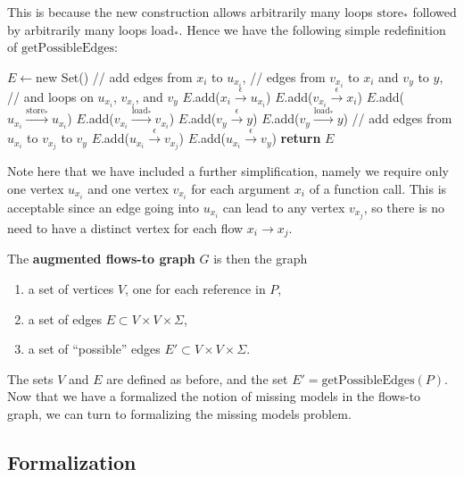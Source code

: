 \documentclass[10pt,twocolumn]{article}
\theoremstyle{definition}
\begin{document}
This is because the new construction allows arbitrarily many loops $\text{store}_*$ followed by arbitrarily many loops $\text{load}_*$. Hence we have the following simple redefinition of $\text{getPossibleEdges}$:
\begin{algorithmic}
  \State $E\gets$new Set()
			\State // add edges from $x_i$ to $u_{x_i}$,
			\State // edges from $v_{x_i}$ to $x_i$ and $v_y$ to $y$,
			\State // and loops on $u_{x_i}$, $v_{x_i}$, and $v_y$
				\State $E$.add($x_i\xrightarrow{\epsilon}u_{x_i}$)
				\State $E$.add($v_{x_i}\xrightarrow{\epsilon}x_i$)
				\State $E$.add($u_{x_i}\xrightarrow{\text{store}_*}u_{x_i}$)
				\State $E$.add($v_{x_i}\xrightarrow{\text{load}_*}v_{x_i}$)
			\EndFor
			\State $E$.add($v_y\xrightarrow{\epsilon}y$)
			\State $E$.add($v_y\xrightarrow{\text{load}_*}y$)
	  	\State // add edges from $u_{x_i}$ to $v_{x_j}$ to $v_y$
	  		\State $E$.add($u_{x_i}\xrightarrow{\epsilon}v_{x_j}$)
	  	\EndFor
	  		\State $E$.add($u_{x_i}\xrightarrow{\epsilon}v_y$)
	  	\EndFor
	  \EndIf
	\EndFor
	\State\textbf{return} $E$
\EndProcedure
\end{algorithmic}
\noindent Note here that we have included a further simplification, namely we require only one vertex $u_{x_i}$ and one vertex $v_{x_i}$ for each argument $x_i$ of a function call. This is acceptable since an edge going into $u_{x_i}$ can lead to any vertex $v_{x_j}$, so there is no need to have a distinct vertex for each flow $x_i\to x_j$. 

The {\bf augmented flows-to graph} $G$ is then the graph
\begin{enumerate}
\item a set of vertices $V$, one for each reference in $P$,
\item a set of edges $E\subset V\times V\times\Sigma$,
\item a set of ``possible'' edges $E'\subset V\times V\times\Sigma$.
\end{enumerate}
\noindent The sets $V$ and $E$ are defined as before, and the set $E'=\text{getPossibleEdges}(P)$. Now that we have a formalized the notion of missing models in the flows-to graph, we can turn to formalizing the missing models problem.

\subsection{Formalization}
\end{document}
